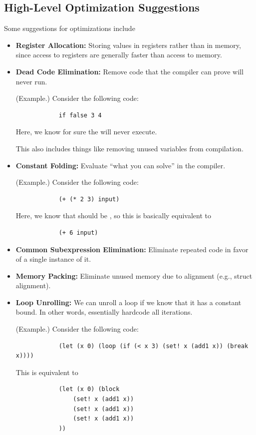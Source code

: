\subsection{High-Level Optimization Suggestions}
Some suggestions for optimizations include 
\begin{itemize}
    \item \textbf{Register Allocation:} Storing values in registers rather than in memory, since access to registers are generally faster than access to memory. 
    \item \textbf{Dead Code Elimination:} Remove code that the compiler can prove will never run.
    \begin{mdframed}
        (Example.) Consider the following code: 
        \begin{verbatim}
            if false 3 4 \end{verbatim}
        Here, we know for sure the  will never execute.
    \end{mdframed}
    This also includes things like removing unused variables from compilation. 

    \item \textbf{Constant Folding:} Evaluate ``what you can solve'' in the compiler. 
    \begin{mdframed}
        (Example.) Consider the following code:
        \begin{verbatim}
            (+ (* 2 3) input)\end{verbatim}
        Here, we know that  should be , so this is basically equivalent to 
        \begin{verbatim}
            (+ 6 input)\end{verbatim}
    \end{mdframed}

    \item \textbf{Common Subexpression Elimination:} Eliminate repeated code in favor of a single instance of it. 
    \item \textbf{Memory Packing:} Eliminate unused memory due to alignment (e.g., struct alignment).
    \item \textbf{Loop Unrolling:} We can unroll a loop if we know that it has a constant bound. In other words, essentially hardcode all iterations.
    \begin{mdframed}
        (Example.) Consider the following code: 
        \begin{verbatim}
            (let (x 0) (loop (if (< x 3) (set! x (add1 x)) (break x))))\end{verbatim}
        This is equivalent to  
        \begin{verbatim}
            (let (x 0) (block 
                (set! x (add1 x))
                (set! x (add1 x))
                (set! x (add1 x))
            ))\end{verbatim}
    \end{mdframed}


\end{itemize}
